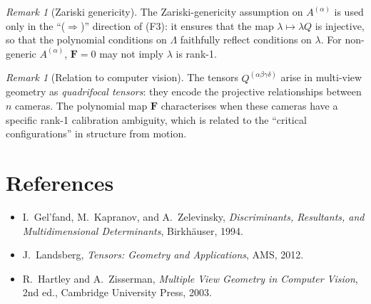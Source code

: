\documentclass[12pt]{article}
\theoremstyle{definition}
\theoremstyle{remark}
\newtheorem{remark}[theorem]{Remark}
\begin{document}
\begin{remark}[Zariski genericity]
The Zariski-genericity assumption on $A^{(\alpha)}$ is used only in the
``($\Rightarrow$)'' direction of (F3): it ensures that the map $\lambda\mapsto
\lambda Q$ is injective, so that the polynomial conditions on $\Lambda$ faithfully
reflect conditions on $\lambda$.  For non-generic $A^{(\alpha)}$, $\mathbf{F}=0$
may not imply $\lambda$ is rank-1.
\end{remark}

\begin{remark}[Relation to computer vision]
The tensors $Q^{(\alpha\beta\gamma\delta)}$ arise in multi-view geometry as
\emph{quadrifocal tensors}: they encode the projective relationships between
$n$ cameras.  The polynomial map $\mathbf{F}$ characterises when these cameras
have a specific rank-1 calibration ambiguity, which is related to the
``critical configurations'' in structure from motion.
\end{remark}

\section*{References}

\begin{itemize}
\item I.~Gel'fand, M.~Kapranov, and A.~Zelevinsky, \emph{Discriminants,
  Resultants, and Multidimensional Determinants}, Birkh\"auser, 1994.
\item J.~Landsberg, \emph{Tensors: Geometry and Applications}, AMS, 2012.
\item R.~Hartley and A.~Zisserman, \emph{Multiple View Geometry in Computer
  Vision}, 2nd ed., Cambridge University Press, 2003.
\end{itemize}
\end{document}
